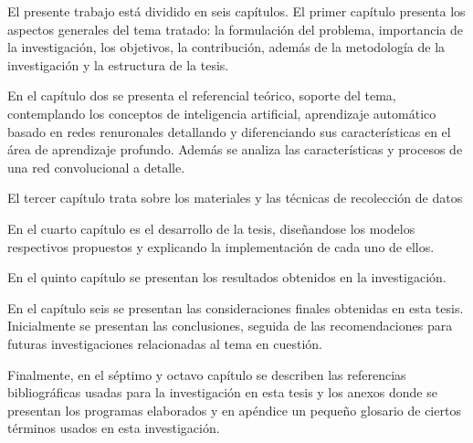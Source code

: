 	\vskip 0.1cm
	El presente trabajo está dividido en seis capítulos. El primer capítulo presenta los aspectos generales del tema tratado: la formulación del problema, importancia de la investigación, los objetivos, la contribución, además de la metodología de la investigación y la estructura de la tesis.

	En el capítulo dos se presenta el referencial teórico, soporte del tema, contemplando los conceptos de inteligencia artificial, aprendizaje automático basado en redes renuronales detallando y diferenciando sus características en el área de aprendizaje profundo. Además se analiza las características y procesos de una red convolucional a detalle.

	El tercer capítulo trata sobre los materiales y las técnicas de recolección de datos

	En el cuarto capítulo es el desarrollo de la tesis, diseñandose los modelos respectivos propuestos y explicando la implementación de cada uno de ellos.
	
	En el quinto capítulo se presentan los resultados obtenidos en la investigación.

	En el capítulo seis se presentan las consideraciones finales obtenidas en esta tesis. Inicialmente se presentan las conclusiones, seguida de las recomendaciones para futuras investigaciones relacionadas al tema en cuestión.

	Finalmente, en el séptimo y octavo capítulo se describen las referencias bibliográficas usadas para la investigación en esta tesis y los anexos donde se presentan los programas elaborados y en apéndice un pequeño glosario de ciertos términos usados en esta investigación.


